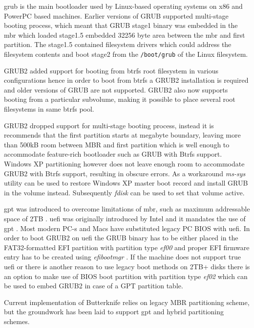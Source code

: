 \documentclass[a4paper,11pt]{kth-mag}
\begin{document}
\acrfull{grub}
is the main bootloader used
by Linux-based operating systems on x86 and PowerPC based machines.
Earlier versions of GRUB supported multi-stage booting process,
which meant that GRUB stage1 binary was embedded in the
\acrfull{mbr} which loaded stage1.5 embedded
32256 byte area between the \acrshort{mbr} and first partition.
The stage1.5 contained filesystem drivers which could
address the filesystem contents and boot stage2 from
the \lstinline!/boot/grub! of the Linux filesystem.
\cite{grub2-fails-to-install}

GRUB2 added support for booting from \acrshort{btrfs} root filesystem
in various configurations
hence in order to boot from
\acrshort{btrfs} a GRUB2 installation is required and older versions of
GRUB are not supported.
GRUB2 also now supports booting from a particular subvolume,
making it possible to place several root filesystems
in same \acrshort{btrfs} pool.
\cite{does-grub-support-btrfs}

GRUB2 dropped support for multi-stage booting process,
instead it is recommends that the first partition
starts at megabyte boundary, leaving
more than 500kB room between MBR
and first partition which is well enough to accommodate
feature-rich bootloader such as GRUB with Btrfs support.
Windows XP partitioning however does not leave enough
room to accommodate GRUB2 with Btrfs support,
resulting in obscure errors.
As a workaround \emph{ms-sys} \cite{ms-sys} utility can be used
to restore Windows XP master boot record and
install GRUB in the volume instead.
Subsequently \emph{fdisk} can be used to set that volume active.

\acrfull{gpt} was introduced to overcome limitations
of \acrlong{mbr}, such as maximum addressable space of 2TB
\cite{mbr-vs-gpt-with-grub}.
\acrfull{uefi} was originally introduced by Intel and it
mandates the use of \acrshort{gpt} \cite{uefi-spec}.
Most modern PC-s and Macs have substituted legacy PC BIOS
with \acrshort{uefi}.
In order to boot GRUB2 on \acrshort{uefi}
the GRUB binary has to be either placed in the
FAT32-formatted
EFI partition with partition type \emph{ef00}
and proper EFI firmware
entry has to be created using \emph{efibootmgr} \cite{efibootmgr}.
If the machine does not support true \acrshort{uefi}
or there is another reason to use legacy boot methods
on 2TB+ disks there is an option to make use
of BIOS boot partition with partition type \emph{ef02}
which can be used to embed GRUB2
in case of a GPT partition table.

Current implementation of Butterknife relies on legacy
MBR partitioning scheme,
but the groundwork has been laid to support
\acrshort{gpt} and hybrid partitioning schemes.
\end{document}
